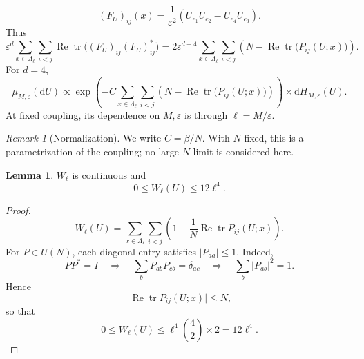 \documentclass[10pt,reqno]{amsart}
\theoremstyle{definition}
\newtheorem{lemma}[definition]{Lemma}
\theoremstyle{remark}
\newtheorem{remark}[definition]{Remark}
\numberwithin{equation}{section}
\numberwithin{figure}{section}
\newcommand{\dd}{\mathrm d}
\newcommand{\e}{\varepsilon}
\DeclareMathOperator{\tr}{tr}
\begin{document}
\begin{equation}\label{eq:lattice-curvature}
(F_U)_{ij}(x)=\frac1{\e^2}\left(U_{e_1}U_{e_2}-U_{e_4}U_{e_3}\right).
\end{equation}
Thus
\begin{equation}\label{eq:display-013}
\e^d\sum_{x\in\Lambda_\ell}\sum_{i<j}
\operatorname{Re}\tr\bigl((F_U)_{ij}(F_U)_{ij}^*\bigr) =2\e^{d-4}\sum_{x\in\Lambda_\ell}\sum_{i<j}
\left(N-\operatorname{Re}\tr\bigl(P_{ij}(U;x)\bigr)\right).
\end{equation}
For $d=4$,
\begin{equation}\label{eq:display-014}
\mu_{M,\e}(\dd U)
\propto\exp\left(-C\sum_{x\in\Lambda_\ell}\sum_{i<j}
\left(N-\operatorname{Re}\tr\bigl(P_{ij}(U;x)\bigr)\right)\right) \times\dd H_{M,\e}(U).
\end{equation}
At fixed coupling, its dependence on $M,\e$ is through $\ell=M/\e$.

\begin{remark}[Normalization]
We write $C=\beta/N$. With $N$ fixed, this is a parametrization of the coupling; no large-$N$ limit is considered here.

\end{remark}

\begin{lemma}\label{lem:wilson-bound} $W_\ell$ is continuous and
\begin{equation}\label{eq:display-015}
0\le W_\ell(U)\le12\ell^4.
\end{equation}
\end{lemma}

\begin{proof}
\begin{equation}\label{eq:display-016}
W_\ell(U)=\sum_{x\in\Lambda_\ell}\sum_{i<j}
\left(1-\frac1N\operatorname{Re}\tr P_{ij}(U;x)\right).
\end{equation}
For $P\in U(N)$, each diagonal entry satisfies $|P_{aa}|\le1$.
Indeed,
\begin{equation}\label{eq:display-017}
PP^*=I\quad\Longrightarrow\quad
\sum_bP_{ab}\overline{P_{cb}}=\delta_{ac}
\quad\Longrightarrow\quad\sum_b|P_{ab}|^2=1.
\end{equation}
Hence
\begin{equation}\label{eq:display-018}
\bigl|\operatorname{Re}\tr P_{ij}(U;x)\bigr|\le N,
\end{equation}
so that
\begin{equation}\label{eq:display-019}
0\le W_\ell(U)\le\ell^4\binom42\times2=12\ell^4.
\end{equation}
\end{proof}
\end{document}
